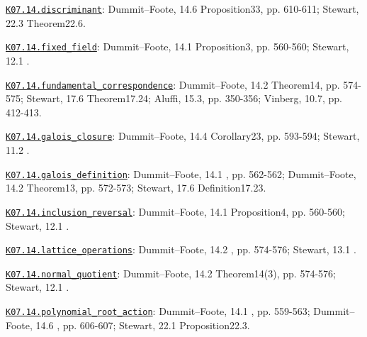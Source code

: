 \par\smallskip\noindent\hypertarget{src:K07.14.discriminant}{}\label{src:K07.14.discriminant}\hyperref[K07.14.discriminant]{\texttt{K07.14.discriminant}}: Dummit--Foote, 14.6 Proposition33, pp. 610-611; Stewart, 22.3 Theorem22.6.
\par\smallskip\noindent\hypertarget{src:K07.14.fixed_field}{}\label{src:K07.14.fixed_field}\hyperref[K07.14.fixed_field]{\texttt{K07.14.fixed\_field}}: Dummit--Foote, 14.1 Proposition3, pp. 560-560; Stewart, 12.1 .
\par\smallskip\noindent\hypertarget{src:K07.14.fundamental_correspondence}{}\label{src:K07.14.fundamental_correspondence}\hyperref[K07.14.fundamental_correspondence]{\texttt{K07.14.fundamental\_correspondence}}: Dummit--Foote, 14.2 Theorem14, pp. 574-575; Stewart, 17.6 Theorem17.24; Aluffi, 15.3, pp. 350-356; Vinberg, 10.7, pp. 412-413.
\par\smallskip\noindent\hypertarget{src:K07.14.galois_closure}{}\label{src:K07.14.galois_closure}\hyperref[K07.14.galois_closure]{\texttt{K07.14.galois\_closure}}: Dummit--Foote, 14.4 Corollary23, pp. 593-594; Stewart, 11.2 .
\par\smallskip\noindent\hypertarget{src:K07.14.galois_definition}{}\label{src:K07.14.galois_definition}\hyperref[K07.14.galois_definition]{\texttt{K07.14.galois\_definition}}: Dummit--Foote, 14.1 , pp. 562-562; Dummit--Foote, 14.2 Theorem13, pp. 572-573; Stewart, 17.6 Definition17.23.
\par\smallskip\noindent\hypertarget{src:K07.14.inclusion_reversal}{}\label{src:K07.14.inclusion_reversal}\hyperref[K07.14.inclusion_reversal]{\texttt{K07.14.inclusion\_reversal}}: Dummit--Foote, 14.1 Proposition4, pp. 560-560; Stewart, 12.1 .
\par\smallskip\noindent\hypertarget{src:K07.14.lattice_operations}{}\label{src:K07.14.lattice_operations}\hyperref[K07.14.lattice_operations]{\texttt{K07.14.lattice\_operations}}: Dummit--Foote, 14.2 , pp. 574-576; Stewart, 13.1 .
\par\smallskip\noindent\hypertarget{src:K07.14.normal_quotient}{}\label{src:K07.14.normal_quotient}\hyperref[K07.14.normal_quotient]{\texttt{K07.14.normal\_quotient}}: Dummit--Foote, 14.2 Theorem14(3), pp. 574-576; Stewart, 12.1 .
\par\smallskip\noindent\hypertarget{src:K07.14.polynomial_root_action}{}\label{src:K07.14.polynomial_root_action}\hyperref[K07.14.polynomial_root_action]{\texttt{K07.14.polynomial\_root\_action}}: Dummit--Foote, 14.1 , pp. 559-563; Dummit--Foote, 14.6 , pp. 606-607; Stewart, 22.1 Proposition22.3.
